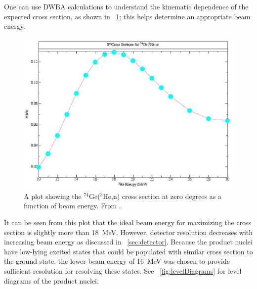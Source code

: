 One can use DWBA calculations to understand the kinematic dependence of the expected cross section, as shown in {\fig}~\ref{fig:optimizeCrossSection}; this helps determine an appropriate beam energy.  
\begin{figure}[htp]
\centering
\includegraphics[width=1.0\textwidth]{figures/74Ge_0plus_xsection.eps}
\caption{A plot showing the $^{74}$Ge($^3$He,n) \zp cross section at zero degrees as a function of beam energy.  From \citep{schiffer_privateCommunication}.}
\label{fig:optimizeCrossSection}
\end{figure}
It can be seen from this plot that the ideal beam energy for maximizing the \reaction cross section is slightly more than 18~MeV.  However, detector resolution decreases with increasing beam energy as discussed in {\sect}~\ref{sec:detector}.  Because the product nuclei \SeProducts have low-lying excited \tp states that could be populated with similar cross section to the ground state, the lower beam energy of 16~MeV was chosen to provide sufficient resolution for resolving these states.  See {\fig}~\ref{fig:levelDiagrams} for level diagrams of the product nuclei.

